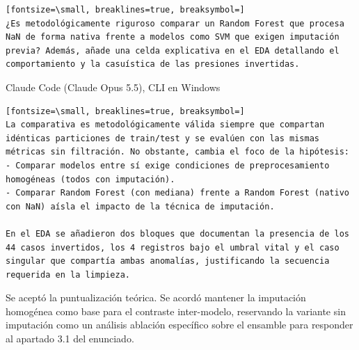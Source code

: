 \documentclass[12pt,a4paper,oneside]{book}
\begin{document}
\begin{iaprompt}
\begin{Verbatim}[fontsize=\small, breaklines=true, breaksymbol=]
¿Es metodológicamente riguroso comparar un Random Forest que procesa NaN de forma nativa frente a modelos como SVM que exigen imputación previa? Además, añade una celda explicativa en el EDA detallando el comportamiento y la casuística de las presiones invertidas.
\end{Verbatim}
\end{iaprompt}
\begin{iaresp}{Claude Code (Claude Opus 5.5), CLI en Windows}
\begin{Verbatim}[fontsize=\small, breaklines=true, breaksymbol=]
La comparativa es metodológicamente válida siempre que compartan idénticas particiones de train/test y se evalúen con las mismas métricas sin filtración. No obstante, cambia el foco de la hipótesis:
- Comparar modelos entre sí exige condiciones de preprocesamiento homogéneas (todos con imputación).
- Comparar Random Forest (con mediana) frente a Random Forest (nativo con NaN) aísla el impacto de la técnica de imputación.

En el EDA se añadieron dos bloques que documentan la presencia de los 44 casos invertidos, los 4 registros bajo el umbral vital y el caso singular que compartía ambas anomalías, justificando la secuencia requerida en la limpieza.
\end{Verbatim}
\end{iaresp}
\begin{iaanalisis}
Se aceptó la puntualización teórica. Se acordó mantener la imputación homogénea como base para el contraste inter-modelo, reservando la variante sin imputación como un análisis ablación específico sobre el ensamble para responder al apartado 3.1 del enunciado.
\end{iaanalisis}
\end{document}

